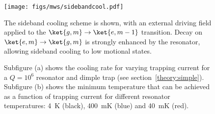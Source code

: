 \begin{figure}[ht]
  \centering
  \texttt{[image: figs/mws/sidebandcool.pdf]}
  \caption{
    The sideband cooling scheme is shown, with an external driving field
    applied to the $\ket{g, m}\rightarrow\ket{e, m-1}$ transition. Decay on
    $\ket{e,m}\rightarrow\ket{g,m}$ is strongly enhanced by the resonator,
    allowing sideband cooling to low motional states.
  }
  \label{mws:fig:sideband}
\end{figure}


\begin{figure}[htb]
  \centering
  \begin{subfigure}[b]{0.44\textwidth}
  \end{subfigure}
  \hspace{1cm}
  \begin{subfigure}[b]{0.44\textwidth}
  \end{subfigure}
  \caption{
    Subfigure (a) shows the cooling rate for varying trapping current for a
    $Q=10^6$ resonator and dimple trap (see section~\ref{theory:simple}).
    Subfigure (b) shows the minimum temperature that can be achieved as a
    function of trapping current for different resonator temperatures:
    \SI{4}{\kelvin} (black), \SI{400}{\milli\kelvin} (blue) and
    \SI{40}{\milli\kelvin} (red).
    }
    \label{mws:fig:sbtemps}
\end{figure}

